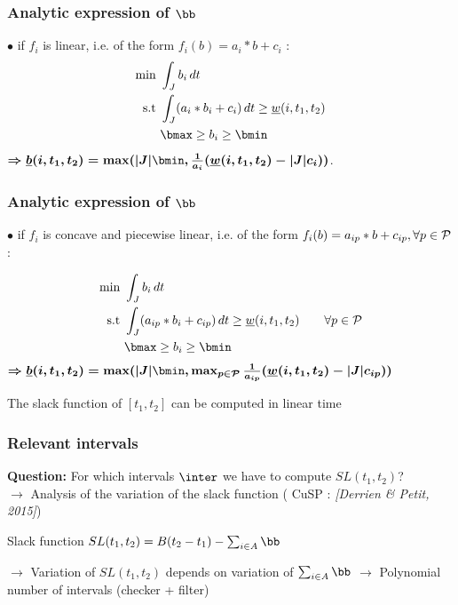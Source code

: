 \begin{frame}
  \frametitle{Analytic expression of $\bb$}
  \vfill
  $\bullet$ if $f_i$ is linear, i.e. of the form $f_i(b)= a_i*b+c_i$ :
  \pause
  \begin{align*}
    \text{min }  & \int_{J} b_i\,dt  \\
    \text{s.t } & \int_{J}(a_i*b_i+c_i)\,dt \ge
                  \underline{w}(i,t_1,t_2)\\
                 & \bmax \ge b_i \ge \bmin
  \end{align*}
  \pause
  { \color{blue!80!black!80}
    $\boldmath{\Rightarrow  \underline{b}(i,t_1,t_2)= \max ( |J|\bmin, \frac{1}{a_i}( \underline{w}(i,t_1,t_2)-|J|c_i))}$}.
  
\end{frame}

\begin{frame}
  \frametitle{Analytic expression of $\bb$}
  \vfill
  $\bullet$  if $f_i$ is concave and piecewise linear, i.e. of the form
  $f_i(b)=a_{ip}*b+c_{ip}, \forall p \in {\cal P}$:
  \pause

  \begin{align*}
    \text{min }  & \int_{J} b_i\,dt  \\
    \text{s.t } & \int_{J}(a_{ip}*b_i+c_{ip})\,dt \ge
                  \underline{w}(i,t_1,t_2) \qquad \forall p \in
                  {\cal P}\\
                 & \bmax \ge b_i \ge \bmin
  \end{align*}
  \pause
  { \color{blue!80!black!80}
    $\boldmath{\Rightarrow  \underline{b}(i,t_1,t_2)= \max ( |J|\bmin, \max_{p
        \in {\cal P}} \frac{1}{a_{ip}}( \underline{w}(i,t_1,t_2)-|J|c_{ip}))}$}
  \vfill
  \begin{prop}
    The slack function of $[t_1,t_2]$ can be computed in linear time
  \end{prop}
\end{frame}


\begin{frame}
  \frametitle{Relevant intervals}
  {\bf Question: } For which intervals $\inter$ we have to compute $SL(t_1,t_2)$?\\
  \vfill
  \pause
  $\rightarrow$ Analysis of the variation of the slack function (
  {\small CuSP : \it \color{gray!50!black!50} [Derrien \& Petit, 2015]})\\
  \vfill
  \begin{block}{Slack function}
    \centering $SL(t_1,t_2)=B(t_2-t_1) - \sum_{i \in A} \bb$
  \end{block}
  \vspace{0.8cm}
  $\rightarrow$ Variation of $SL(t_1,t_2)$ depends on variation of 
  $\sum_{i \in A} \bb$
  \vfill 
  $\rightarrow$ Polynomial number of intervals (checker + filter)  \vfill 
\end{frame}

